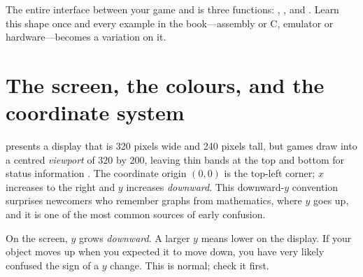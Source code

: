 \begin{prgconcept}
The entire interface between your game and \prg is three functions:
, , and . Learn this shape once and every
example in the book---assembly or C, emulator or hardware---becomes a variation
on it.
\end{prgconcept}

\section{The screen, the colours, and the coordinate system}

\prg presents a display that is 320 pixels wide and 240 pixels tall, but games
draw into a centred \emph{viewport} of 320 by 200, leaving thin bands at the top
and bottom for status information \citep{prg32repo}. The coordinate origin
$(0,0)$ is the top-left corner; $x$ increases to the right and $y$ increases
\emph{downward}. This downward-$y$ convention surprises newcomers who remember
graphs from mathematics, where $y$ goes up, and it is one of the most common
sources of early confusion.

\begin{prgwarn}
On the screen, $y$ grows \emph{downward}. A larger $y$ means lower on the
display. If your object moves up when you expected it to move down, you have very
likely confused the sign of a $y$ change. This is normal; check it first.
\end{prgwarn}

\begin{center}
\label{fig:screen}
\end{center}

